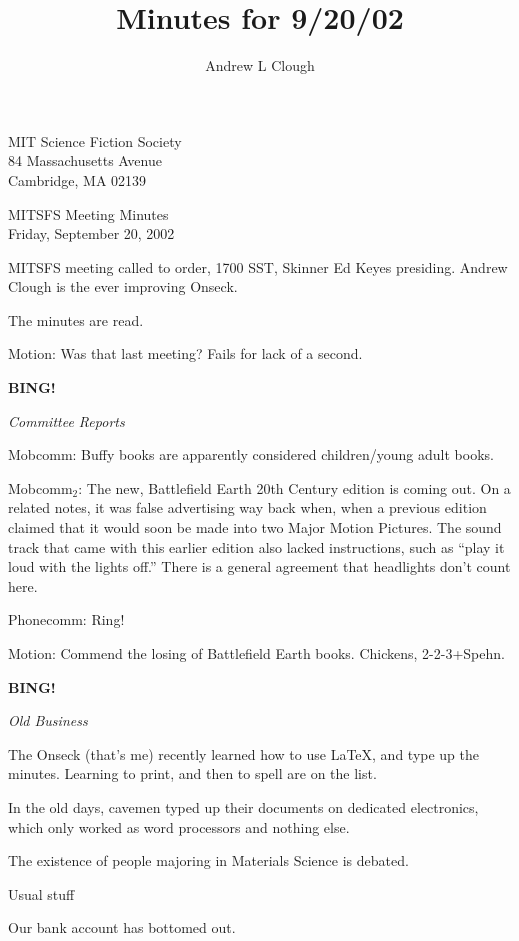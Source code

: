 \documentclass{article}
\title{Minutes for 9/20/02}
\author{Andrew L Clough}
\begin{document}
\begin{center}
MIT Science Fiction Society\\
84 Massachusetts Avenue\\
Cambridge, MA 02139
\end{center}

\begin{center}
MITSFS Meeting Minutes\\
Friday, September 20, 2002\\
\end{center}

MITSFS meeting called to order, 1700 SST, Skinner Ed Keyes presiding.  Andrew Clough is the ever improving Onseck.

The minutes are read.

Motion: Was that last meeting?  Fails for lack of a second.


\textbf{BING!}
\begin{center}
\textit{Committee Reports}
\end{center}

Mobcomm: Buffy books are apparently considered children/young adult books.

Mobcomm$_2$: The new, Battlefield Earth 20th Century edition is coming
out.  On a related notes, it was false advertising way back when, when
a previous edition claimed that it would soon be made into two Major
Motion Pictures.  The sound track that came with this earlier edition
also lacked instructions, such as ``play it loud with the lights off.''
There is a general agreement that headlights don't count here.

Phonecomm: Ring!

Motion:  Commend the losing of Battlefield Earth books.  Chickens, 2-2-3+Spehn.


\textbf{BING!}
\begin{center}
\textit{Old Business}
\end{center}

The Onseck (that's me) recently learned how to use \LaTeX, and type up the minutes.  Learning to print, and then to spell are on the list.

In the old days, cavemen typed up their documents on dedicated electronics, which only worked as word processors and nothing else.  

The existence of people majoring in Materials Science is debated.

Usual stuff

Our bank account has bottomed out.
\end{document}
